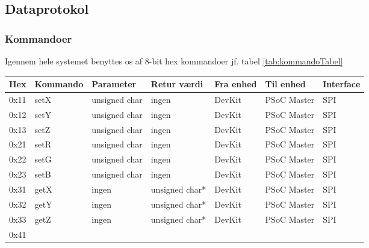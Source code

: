 \subsection{Dataprotokol}

\subsubsection{Kommandoer}

Igennem hele systemet benyttes os af 8-bit hex kommandoer jf. tabel \ref{tab:kommandoTabel}

\begin{table}[H]
    \centering
    \begin{tabular}{|c|l|l|l|l|l|l|}
    \hline
        \textbf{Hex} &
        \textbf{Kommando} &
        \textbf{Parameter} &
        \textbf{Retur værdi} &
        \textbf{Fra enhed} &
        \textbf{Til enhed} &
        \textbf{Interface}\\
    \hline
        0x11 &
        setX &
        unsigned char &
        ingen &
        DevKit &
        PSoC Master &
        SPI \\
    \hline
        0x12 &
        setY &
        unsigned char &
        ingen &
        DevKit &
        PSoC Master &
        SPI \\
    \hline
        0x13 &
        setZ &
        unsigned char &
        ingen &
        DevKit &
        PSoC Master &
        SPI \\
    \hline
        0x21 &
        setR &
        unsigned char &
        ingen &
        DevKit &
        PSoC Master &
        SPI \\
    \hline
        0x22 &
        setG &
        unsigned char &
        ingen &
        DevKit &
        PSoC Master &
        SPI \\
    \hline
        0x23 &
        setB &
        unsigned char &
        ingen &
        DevKit &
        PSoC Master &
        SPI \\
    \hline
        0x31 &
        getX &
        ingen &
        unsigned char* &
        DevKit &
        PSoC Master &
        SPI \\
    \hline
        0x32 &
        getY &
        ingen &
        unsigned char* &
        DevKit &
        PSoC Master &
        SPI \\
    \hline
        0x33 &
        getZ &
        ingen &
        unsigned char* &
        DevKit &
        PSoC Master &
        SPI \\
    \hline
        0x41 &

\end{tabular}
\end{table}
